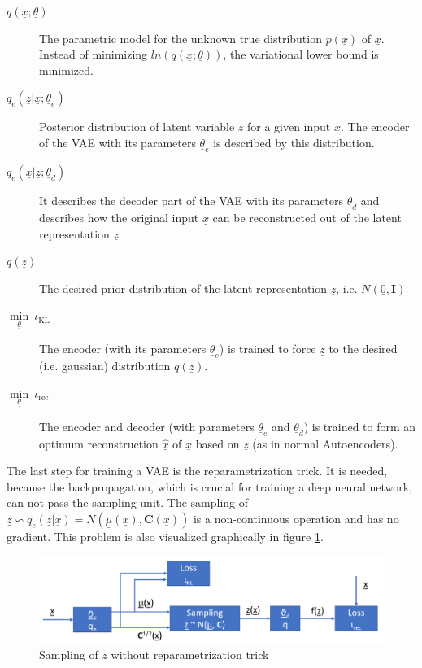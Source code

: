 \documentclass[12pt,DIV14,BCOR12mm,a4paper,footexclude,headinclude,halfparskip-,twoside,openright,cleardoubleempty,idxtotoc,bibtotoc,listtotoc]{scrreprt} %
\numberwithin{equation}{chapter}
\begin{document}
\begin{description}
	\item[$q(\underline{x};\underline{\theta})$]The parametric model for the unknown true distribution $p(\underline{x})$ of $\underline{x}$. Instead of minimizing $ln(q(\underline{x};\underline{\theta}))$, the variational lower bound is minimized.
	\item[$q_e(\underline{z}|\underline{x};\underline{\theta}_e)$]Posterior distribution of latent variable $\underline{z}$ for a given input $\underline{x}$. The encoder of the VAE with its parameters $\underline{\theta}_e$ is described by this distribution.
	\item[$q_e(\underline{x}|\underline{z};\underline{\theta}_d)$]It describes the decoder part of the VAE with its parameters $\underline{\theta}_d$ and describes how the original input $\underline{x}$ can be reconstructed out of the latent representation $\underline{z}$
	\item[$q(\underline{z})$]The desired prior distribution of the latent representation $\underline{z}$, i.e. $N(\underline{0}, \mathbf{I})$
	\item[$\underset{\underline{\theta}}\min\ \iota_{\textrm{KL}}$]The encoder (with its parameters $\underline{\theta}_e$) is trained to force $\underline{z}$ to the desired (i.e. gaussian) distribution $q(\underline{z})$.
	\item[$\underset{\underline{\theta}}\min\ \iota_{\textrm{rec}}$]The encoder and decoder (with parameters $\underline{\theta}_e$ and $\underline{\theta}_d$) is trained to form an optimum reconstruction $\hat{\underline{x}}$ of $\underline{x}$ based on $\underline{z}$ (as in normal Autoencoders).
\end{description}
The last step for training a VAE is the reparametrization trick. It is needed, because the backpropagation, which is crucial for training a deep neural network, can not pass the sampling unit. The sampling of $\underline{z} \backsim q_e(\underline{z}|\underline{x}) = N(\underline{\mu}(\underline{x}), \mathbf{C}(\underline{x}))$ is a non-continuous operation and has no gradient. This problem is also visualized graphically in figure \ref{fig:Sampling_wo_reparametrization}.
\begin{figure}[htb!]
	\centering
	\includegraphics[width=0.75\linewidth]{Graphiken/VAE_wo_reparametrization}
	\caption{Sampling of $\underline{z}$ without reparametrization trick}
	\label{fig:Sampling_wo_reparametrization}
\end{figure}
\end{document}
